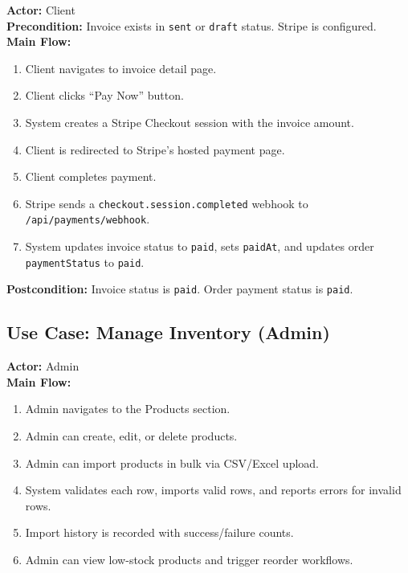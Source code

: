 ﻿\documentclass[12pt,a4paper]{report}
\begin{document}
\begin{tcolorbox}[reqbox,title={UC-02: Pay Invoice via Stripe}]
\textbf{Actor:} Client \\
\textbf{Precondition:} Invoice exists in \texttt{sent} or \texttt{draft} status. Stripe is configured. \\
\textbf{Main Flow:}
\begin{enumerate}[leftmargin=1.5em]
  \item Client navigates to invoice detail page.
  \item Client clicks ``Pay Now'' button.
  \item System creates a Stripe Checkout session with the invoice amount.
  \item Client is redirected to Stripe's hosted payment page.
  \item Client completes payment.
  \item Stripe sends a \texttt{checkout.session.completed} webhook to \texttt{/api/payments/webhook}.
  \item System updates invoice status to \texttt{paid}, sets \texttt{paidAt}, and updates order \texttt{paymentStatus} to \texttt{paid}.
\end{enumerate}
\textbf{Postcondition:} Invoice status is \texttt{paid}. Order payment status is \texttt{paid}.
\end{tcolorbox}

\subsection{Use Case: Manage Inventory (Admin)}

\begin{tcolorbox}[reqbox,title={UC-03: Admin Inventory Management}]
\textbf{Actor:} Admin \\
\textbf{Main Flow:}
\begin{enumerate}[leftmargin=1.5em]
  \item Admin navigates to the Products section.
  \item Admin can create, edit, or delete products.
  \item Admin can import products in bulk via CSV/Excel upload.
  \item System validates each row, imports valid rows, and reports errors for invalid rows.
  \item Import history is recorded with success/failure counts.
  \item Admin can view low-stock products and trigger reorder workflows.
\end{enumerate}
\end{tcolorbox}
\end{document}
